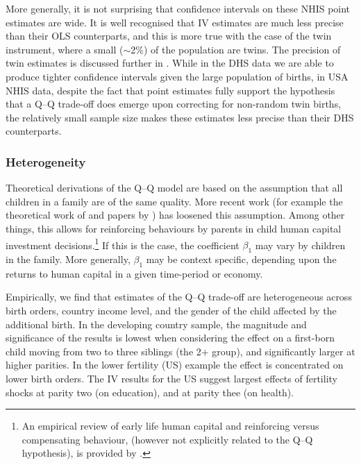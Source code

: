 \documentclass[subeqn]{article}
\begin{document}
\begin{spacing}{1.4}
More generally, it is not surprising that confidence intervals on these NHIS
point estimates are wide.  It is well recognised that IV estimates are much
less precise than their OLS counterparts, and this is more true with the case
of the twin instrument, where a small ($\sim$2\%) of the population are twins.
The precision of twin estimates is discussed further in \citet{Angristetal2010}.
While in the DHS data we are able to produce tighter confidence intervals given
the large population of births, in USA NHIS data, despite the fact that point 
estimates fully support the hypothesis that a Q--Q trade-off does emerge upon 
correcting for non-random twin births, the relatively small sample size makes 
these estimates less precise than their DHS counterparts.

\subsubsection{Heterogeneity}
Theoretical derivations of the Q--Q model are based on the assumption that all
children in a family are of the same quality. More recent work (for example the 
theoretical work of \citet{AizerCunha2012} and papers by \citet{Brinchetal2016,
  MogstadWiswall2016}) has loosened this assumption. Among 
other things, this allows for reinforcing behaviours by parents in child human 
capital investment decisions.\footnote{An empirical review of early life human 
capital and reinforcing versus compensating behaviour, (however not explicitly 
related to the Q--Q hypothesis), is provided by \citet{AlmondMazumder2013}.} If 
this is the case, the coefficient $\beta_1$ may vary by children in the family. 
More generally, $\beta_1$ may be context specific, depending upon the returns to 
human capital in a given time-period or economy.

Empirically, we find that estimates of the Q--Q trade-off are heterogeneous 
across birth orders, country income level, and the gender of the child affected 
by the additional birth. In the developing country sample, the magnitude and
significance of the results is lowest when considering the effect on a first-born
child moving from two to three siblings (the 2+ group), and significantly larger
at higher parities.  In the lower fertility (US) example the effect is
concentrated on lower birth orders. The IV results for the US suggest largest
effects of fertility shocks at parity two (on education), and at parity thee
(on health).


\end{spacing}
\end{document}

